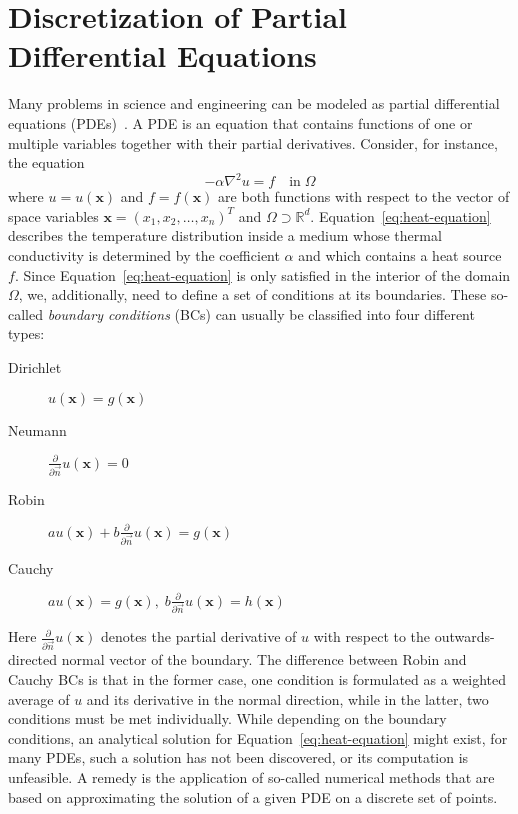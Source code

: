 \section{Discretization of Partial Differential Equations}\label{sec:discretization}
Many problems in science and engineering can be modeled as partial differential equations (PDEs)~\cite{folland2020introduction,evans2010partial}.
A PDE is an equation that contains functions of one or multiple variables together with their partial derivatives.
Consider, for instance, the equation
\begin{equation}
	-\alpha \nabla^2 u = f \quad \text{in} \; \Omega 
	\label{eq:heat-equation}
\end{equation}
where $u = u(\bm{x})$ and $f = f(\bm{x})$ are both functions with respect to the vector of space variables $\bm{x} = (x_1, x_2, \dots, x_n)^T$ and $\Omega \supset \mathbb{R}^d$.
Equation~\eqref{eq:heat-equation} describes the temperature distribution inside a medium whose thermal conductivity is determined by the coefficient $\alpha$ and which contains a heat source $f$.
Since Equation~\eqref{eq:heat-equation} is only satisfied in the interior of the domain $\Omega$, we, additionally, need to define a set of conditions at its boundaries.
These so-called \emph{boundary conditions} (BCs) can usually be classified into four different types:
\begin{description}
	\item[Dirichlet] $u(\bm{x}) = g(\bm{x})$
	\item[Neumann] $\frac{\partial}{\partial \vec{n}} u(\bm{x}) = 0$
	\item[Robin] $a u(\bm{x}) + b \frac{\partial}{\partial \vec{n}} u(\bm{x}) = g(\bm{x})$
	\item[Cauchy] $a u(\bm{x}) = g(\bm{x}), \; b \frac{\partial}{\partial \vec{n}} u(\bm{x}) = h(\bm{x})$
\end{description}
Here $\frac{\partial}{\partial \vec{n}} u(\bm{x})$ denotes the partial derivative of $u$ with respect to the outwards-directed normal vector of the boundary.
The difference between Robin and Cauchy BCs is that in the former case, one condition is formulated as a weighted average of $u$ and its derivative in the normal direction, while in the latter, two conditions must be met individually.
While depending on the boundary conditions, an analytical solution for Equation~\eqref{eq:heat-equation} might exist, for many PDEs, such a solution has not been discovered, or its computation is unfeasible.
A remedy is the application of so-called numerical methods that are based on approximating the solution of a given PDE on a discrete set of points. 
